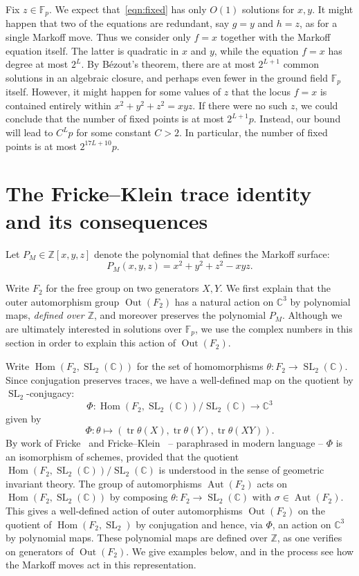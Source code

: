 \documentclass[AHL, Unicode, longabstracts, published]{cedram}
\newcommand{\Z}{\mathbb{Z}}
\newcommand{\CC}{\mathbb{C}}
\newcommand{\F}{\mathbb{F}}
\DeclareMathOperator{\tr}{tr}
\DeclareMathOperator{\SL}{SL}
\DeclareMathOperator{\Hom}{Hom}
\DeclareMathOperator{\Aut}{Aut}
\DeclareMathOperator{\Out}{Out}
\newcommand{\Z}{\mathbb{Z}}
\begin{document}
Fix $z \in \F_p$. We expect that~\eqref{eqn:fixed} has only $O(1)$ solutions for $x,y$. It might happen that two of the equations are redundant, say $g=y$ and $h=z$, as for a single Markoff move. Thus we consider only $f=x$ together with the Markoff equation itself. The latter is quadratic in $x$ and $y$, while the equation $f=x$ has degree at most $2^L$. By Bézout's theorem, there are at most $2^{L+1}$ common solutions in an algebraic closure, and perhaps even fewer in the ground field $\F_p$ itself. However, it might happen for some values of $z$ that the locus $f=x$ is contained entirely within $x^2+y^2+z^2=xyz$. If there were no such $z$, we could conclude that the number of fixed points is at most $2^{L+1}p$. Instead, our bound will lead to $C^L p$ for some constant $C > 2$. In particular, the number of fixed points is at most $2^{17L+10}p$.



\section{The Fricke--Klein trace identity and its consequences} \label{sec:fricke}

Let $P_M\in \Z[x,y,z]$ denote the polynomial that defines the Markoff surface:
\[
P_M(x,y,z)= x^2 + y^2 + z^2 - xyz.
\]

Write $F_2$ for the free group on two generators $X,Y$. We first explain that the outer automorphism group $\Out(F_2)$ has a natural action on $\CC^3$ by polynomial maps, \emph{defined over $\Z$}, and moreover preserves the polynomial $P_M$. Although we are ultimately interested in solutions over $\F_p$, we use the complex numbers in this section in order to explain this action of $\Out(F_2)$.

Write $\Hom(F_2, \SL_2(\CC))$ for the set of homomorphisms $\theta : F_2 \rightarrow \SL_2(\CC)$. Since conjugation preserves traces, we have a well-defined map on the quotient by $\SL_2$-conjugacy:
\[
\Phi: \Hom(F_{2},\SL_{2}(\CC))/\SL_{2}(\CC)\to \CC^3
\]
given by
\[
\Phi : \theta \mapsto (\tr\theta(X),\tr\theta(Y),\tr\theta(XY)).
\]
By work of Fricke~\cite{FRICKE} and Fricke--Klein~\cite{FRICKEKLEIN} -- paraphrased in modern language -- $\Phi$ is an isomorphism of schemes, provided that the quotient $\Hom(F_{2},\SL_{2}(\CC))/\SL_{2}(\CC)$ is understood in the sense of geometric invariant theory. The group of automorphisms $\Aut(F_2)$ acts on $\Hom(F_2,\SL_{2}(\CC))$ by composing $\theta: F_2 \rightarrow \SL_2(\CC)$ with $\sigma \in \Aut(F_2)$. This gives a well-defined action of outer automorphisms $\Out(F_2)$ on the quotient of $\Hom(F_2,\SL_2)$ by conjugation and hence, via $\Phi$, an action on $\CC^3$ by polynomial maps. These polynomial maps are defined over $\Z$, as one verifies on generators of $\Out(F_2)$. We give examples below, and in the process see how the Markoff moves act in this representation.
\end{document}
